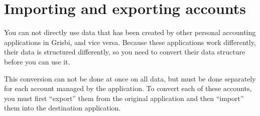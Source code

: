 

\chapter{Importing and exporting accounts\label{importexport}}

You can not directly use data that has been created by other personal accounting applications in Grisbi, and vice versa. Because these applications work differently, their data is structured differently, so you need to convert their data structure before you can use it.

This conversion can not be done at once on all data, but must be done separately for each account managed by the application. To convert each of these accounts, you must first \enquote{export} them from the original application and then \enquote{import} them into the destination application.


